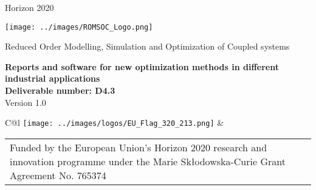 \documentclass{ROMSOC}
\begin{document}
\graphicspath{{../images/}}

\newcommand{\DelTitle}{Reports and software for new optimization methods in different industrial applications}
\newcommand{\DelNumber}{D4.3}
\newcommand{\DelVersion}{1.0}
\newcommand{\footertext}{\raisebox{3mm}{Deliverable \DelNumber}}
\setlength{\footheight}{40pt}
\newcommand{\footerlogo}{\raisebox{3mm}{\leavevmode\texttt{[image: ROMSOC\_Logo\_bw.png]}}}
\clearscrheadfoot
\pagestyle{empty}



\begin{center}
Horizon 2020
\vspace{2cm}

  \begin{center}
  \texttt{[image: ../images/ROMSOC\_Logo.png]}
  \vspace{2mm}
  \end{center}
  \vspace{1cm}
  {\Large Reduced Order Modelling, Simulation and Optimization of Coupled systems}
  \vspace{2cm}

  \begin{spacing}{2.5}
    \textbf{\Huge \DelTitle}\\\vspace{10mm}
    \textbf{\Large Deliverable number: \DelNumber} \\\vspace{10mm} 
    {\large Version \DelVersion}
  \end{spacing}
  
  \vspace*{\fill}

  \begin{tabular}{C@{\hspace*{0cm}}l}
    \texttt{[image: ../images/logos/EU\_Flag\_320\_213.png]} &
    \begin{tabular}{p{12cm}}
    {Funded by the European Union’s Horizon 2020 research and innovation programme
    under the Marie Sk\l odowska-Curie Grant Agreement No. 765374}
    \end{tabular}
  \end{tabular}
\end{center}
\end{document}
